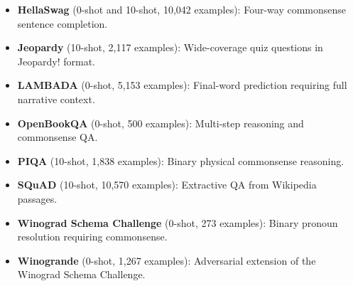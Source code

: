 \documentclass{article}
\begin{document}
\begin{itemize}
  \item \textbf{HellaSwag} \parencite{zellers2019hellaswag} (0-shot and 10-shot, 10,042 examples):
  Four-way commonsense sentence completion.

  \item \textbf{Jeopardy} \parencite{kaggle2019jeopardy} (10-shot, 2,117 examples):
  Wide-coverage quiz questions in Jeopardy! format.

  \item \textbf{LAMBADA} \parencite{paperno2016lambada} (0-shot, 5,153 examples):
  Final-word prediction requiring full narrative context.

  \item \textbf{OpenBookQA} \parencite{mihaylov2018openbookqa} (0-shot, 500 examples):
  Multi-step reasoning and commonsense QA.

  \item \textbf{PIQA} \parencite{bisk2020piqa} (10-shot, 1,838 examples):
  Binary physical commonsense reasoning.

  \item \textbf{SQuAD} \parencite{rajpurkar2016squad} (10-shot, 10,570 examples):
  Extractive QA from Wikipedia passages.

  \item \textbf{Winograd Schema Challenge} \parencite{levesque2012winograd} (0-shot, 273 examples):
  Binary pronoun resolution requiring commonsense.

  \item \textbf{Winogrande} \parencite{sakaguchi2020winogrande} (0-shot, 1,267 examples):
  Adversarial extension of the Winograd Schema Challenge.

\end{itemize}
\end{document}
